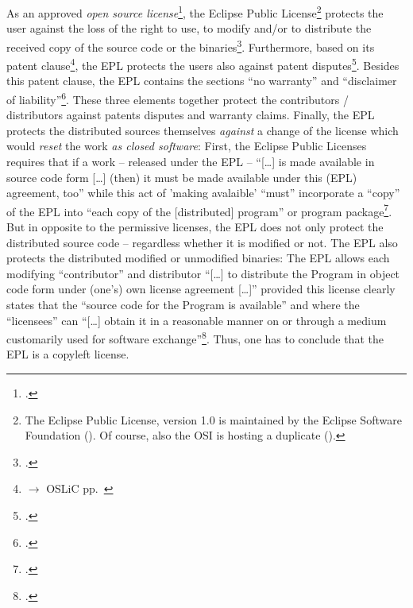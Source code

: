 As an approved \emph{open source license}\footcite[cf.][\nopage wp]{OSI2012b},
the Eclipse Public License\footnote{ The Eclipse Public License, version 1.0 is
maintained by the Eclipse Software Foundation (\cite[cf.][\nopage
wp]{Epl10EclipseFoundation2005a}).  Of course, also the OSI is hosting a
duplicate (\cite[cf.][\nopage wp]{Epl10OsiLicense2005a}).} protects the user
against the loss of the right to use, to modify and/or to distribute the
received copy of the source code or the binaries\footcite[cf.][\nopage wp
§2a]{Epl10OsiLicense2005a}. Furthermore, based on its patent
clause\footnote{$\rightarrow$ OSLiC pp.\ \pageref{subsec:EpLPatentClause}}, the
EPL protects the users also against patent disputes\footcite[cf.][\nopage wp §2b
\& §2c]{Epl10OsiLicense2005a}. Besides this patent clause, the EPL contains the
sections \enquote{no warranty} and \enquote{disclaimer of
liability}\footcite[cf.][\nopage wp §5 \& §6]{Epl10OsiLicense2005a}. These three
elements together protect the contributors / distributors against patents
disputes and warranty claims. Finally, the EPL protects the distributed sources
themselves \emph{against} a change of the license which would \emph{reset} the
work \emph{as closed software}: First, the Eclipse Public Licenses requires that
if a work -- released under the EPL -- \enquote{[\ldots] is made available in
source code form [\ldots] (then) it must be made available under this (EPL)
agreement, too} while this act of 'making avalaible' \enquote{must} incorporate
a \enquote{copy} of the EPL into \enquote{each copy of the [distributed]
program} or program package\footcite[cf.][\nopage wp §3]{Epl10OsiLicense2005a}.
But in opposite to the permissive licenses, the EPL does not only protect the
distributed source code -- regardless whether it is modified or not. The EPL
also protects the distributed modified or unmodified binaries: The EPL allows
each modifying \enquote{contributor} and distributor \enquote{[\ldots] to
distribute the Program in object code form under (one's) own license agreement
[\ldots]} provided this license clearly states that the \enquote{source code for
the Program is available} and where the \enquote{licensees} can
\enquote{[\ldots] obtain it in a reasonable manner on or through a medium
customarily used for software exchange}\footcite[cf.][\nopage wp §3, esp.
§3.b.iv]{Epl10OsiLicense2005a}. Thus, one has to conclude that the EPL is a
copyleft license.

